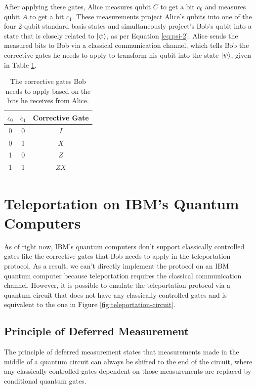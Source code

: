 \documentclass[prx,twocolumn]{revtex4-2}
\numberwithin{equation}{section}
\numberwithin{figure}{section}
\numberwithin{table}{section}
\begin{document}
After applying these gates, Alice measures qubit $C$ to get a bit $c_0$ and measures qubit $A$ to get a bit 
$c_1$. These measurements project Alice's qubits into one of the four 2-qubit standard basis states and
simultaneously project's Bob's qubit into a state that is closely related to $\ket\psi$, as per Equation 
\ref{eq:psi-2}. Alice sends the measured bits to Bob via a classical communication channel, which tells Bob 
the corrective gates he needs to apply to transform his qubit into the state $\ket\psi$, given in Table 
\ref{tab:corrective-gates}.

\begin{table}[h]
    \centering
    \begin{tabular}{|c|c||c|}
        \hline 
        $c_0$ & $c_1$ & Corrective Gate \\ \hline \hline 
        0 & 0 & $I$ \\ \hline
        0 & 1 & $X$ \\ \hline
        1 & 0 & $Z$ \\ \hline
        1 & 1 & $ZX$ \\ \hline
    \end{tabular}
    \caption{The corrective gates Bob needs to apply based on the bits he receives from Alice.}
    \label{tab:corrective-gates}
\end{table}

\section{Teleportation on IBM's Quantum Computers}
As of right now, IBM's quantum computers don't support classically controlled gates \cite{Qiskit-Textbook} 
like the corrective gates that Bob needs to apply in the teleportation protocol. As a result, we can't
directly implement the protocol on an IBM quantum computer because teleportation requires the classical 
communication channel. However, it is possible to emulate the teleportation protocol via a quantum circuit 
that does not have any classically controlled gates and is equivalent to the one in 
Figure \ref{fig:teleportation-circuit}.
\subsection{Principle of Deferred Measurement}
The principle of deferred measurement states that measurements made in the middle of a quantum circuit can 
always be shifted to the end of the circuit, where any classically controlled gates dependent on those 
measurements are replaced by conditional quantum gates. \cite{nielsen-chuang}
\end{document}
